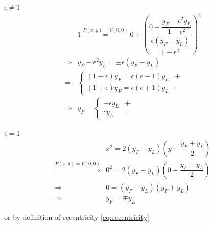 \documentclass[
]{book}
\theoremstyle{definition}
\theoremstyle{definition}
\theoremstyle{definition}
\theoremstyle{definition}
\theoremstyle{remark}
\begin{document}
\(\epsilon\ne1\) \[
\begin{aligned}
 & 1\overset{P\left(x,y\right)=V\left(0,0\right)}{=}0+\left(\dfrac{0-\dfrac{y_{{\scriptscriptstyle F}}-\epsilon^{2}y_{{\scriptscriptstyle L}}}{1-\epsilon^{2}}}{\dfrac{\epsilon\left(y_{{\scriptscriptstyle F}}-y_{{\scriptscriptstyle L}}\right)}{1-\epsilon^{2}}}\right)^{2}\\
\Rightarrow & y_{{\scriptscriptstyle F}}-\epsilon^{2}y_{{\scriptscriptstyle L}}=\pm\epsilon\left(y_{{\scriptscriptstyle F}}-y_{{\scriptscriptstyle L}}\right)\\
\Rightarrow & \begin{cases}
\left(1-\epsilon\right)y_{{\scriptscriptstyle F}}=\epsilon\left(\epsilon-1\right)y_{{\scriptscriptstyle L}} & +\\
\left(1+\epsilon\right)y_{{\scriptscriptstyle F}}=\epsilon\left(\epsilon+1\right)y_{{\scriptscriptstyle L}} & -
\end{cases}\\
\Rightarrow & y_{{\scriptscriptstyle F}}=\begin{cases}
-\epsilon y_{{\scriptscriptstyle L}} & +\\
\epsilon y_{{\scriptscriptstyle L}} & -
\end{cases}
\end{aligned}
\]

\(\epsilon=1\) \[
\begin{aligned}
 & x^{2}=2\left(y_{{\scriptscriptstyle F}}-y_{{\scriptscriptstyle L}}\right)\left(y-\dfrac{y_{{\scriptscriptstyle F}}+y_{{\scriptscriptstyle L}}}{2}\right)\\
\overset{P\left(x,y\right)=V\left(0,0\right)}{\Rightarrow} & 0^{2}=2\left(y_{{\scriptscriptstyle F}}-y_{{\scriptscriptstyle L}}\right)\left(0-\dfrac{y_{{\scriptscriptstyle F}}+y_{{\scriptscriptstyle L}}}{2}\right)\\
\Rightarrow & 0=\left(y_{{\scriptscriptstyle F}}-y_{{\scriptscriptstyle L}}\right)\left(y_{{\scriptscriptstyle F}}+y_{{\scriptscriptstyle L}}\right)\\
\Rightarrow & y_{{\scriptscriptstyle F}}=\mp y_{{\scriptscriptstyle L}}
\end{aligned}
\]

or by definition of eccentricity \eqref{eq:eccentricity}
\end{document}

